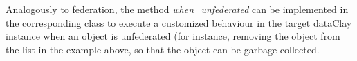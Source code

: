 Analogously to federation, the method \textit{when\_unfederated} can be implemented in the corresponding class to execute a customized behaviour in the target dataClay instance when an object is unfederated (for instance, removing the object from the list in the example above, so that the object can be garbage-collected.

\FEDERATION{

}